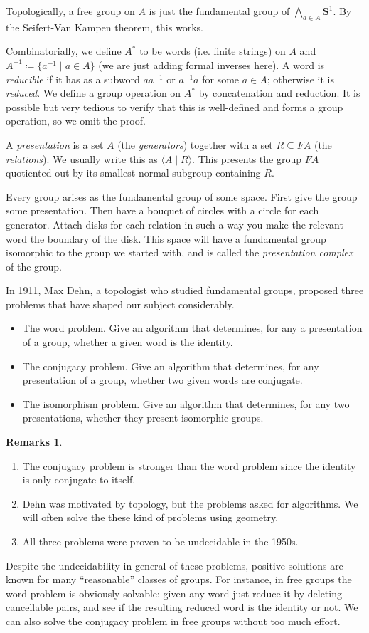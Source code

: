 \documentclass{report}
\theoremstyle{definition}
\theoremstyle{plain}
\theoremstyle{definition}
\newtheorem{rems}[thm]{Remarks}
\begin{document}
	Topologically, a free group on $A$ is just the fundamental group of $\bigwedge_{a\in A}\mathbf{S}^1$. By the Seifert-Van Kampen theorem, this works.
	
	Combinatorially, we define $A^*$ to be words (i.e. finite strings) on $A$ and $A^{-1} \coloneqq \{a^{-1} \mid a \in A\}$ (we are just adding formal inverses here). A word is \emph{reducible} if it has as a subword $aa^{-1}$ or $a^{-1}a$ for some $a\in A$; otherwise it is \emph{reduced}. We define a group operation on $A^*$ by concatenation and reduction. It is possible but very tedious to verify that this is well-defined and forms a group operation, so we omit the proof.
	
	A \emph{presentation} is a set $A$ (the \emph{generators}) together with a set $R\subseteq FA$ (the \emph{relations}). We usually write this as $\langle A \mid R\rangle$. This presents the group $FA$ quotiented out by its smallest normal subgroup containing $R$.
	
	Every group arises as the fundamental group of some space. First give the group some presentation. Then have a bouquet of circles with a circle for each generator. Attach disks for each relation in such a way you make the relevant word the boundary of the disk. This space will have a fundamental group isomorphic to the group we started with, and is called the \emph{presentation complex} of the group.
	
	In 1911, Max Dehn, a topologist who studied fundamental groups, proposed three problems that have shaped our subject considerably.
	\begin{itemize}
		\item The word problem. Give an algorithm that determines, for any a presentation of a group, whether a given word is the identity. 
		\item The conjugacy problem. Give an algorithm that determines, for any presentation of a group, whether two given words are conjugate.
		\item The isomorphism problem. Give an algorithm that determines, for any two presentations, whether they present isomorphic groups.
	\end{itemize}
	\begin{rems}\leavevmode
		\begin{enumerate}
			\item The conjugacy problem is stronger than the word problem since the identity is only conjugate to itself.
			\item Dehn was motivated by topology, but the problems asked for algorithms. We will often solve the these kind of problems using geometry.
			\item All three problems were proven to be undecidable in the 1950s. 
		\end{enumerate}
	\end{rems}
	Despite the undecidability in general of these problems, positive solutions are known for many ``reasonable'' classes of groups. For instance, in free groups the word problem is obviously solvable: given any word just reduce it by deleting cancellable pairs, and see if the resulting reduced word is the identity or not. We can also solve the conjugacy problem in free groups without too much effort.
	
\end{document}
